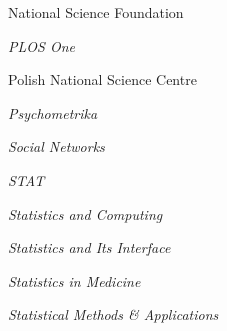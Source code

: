 \documentclass[11pt]{article}
\begin{document}
\begin{description}
\item National Science Foundation
\item {\it PLOS One}
\item Polish National Science Centre
\item {\it Psychometrika}
\item {\it Social Networks}
\item {\it STAT}
\item {\it Statistics and Computing}
\item {\it Statistics and Its Interface}
\item {\it Statistics in Medicine}
\item {\it Statistical Methods \& Applications}
\end{description}

\end{document}
